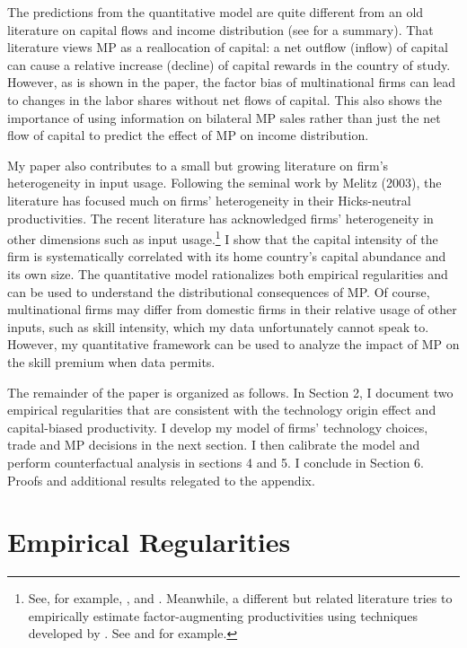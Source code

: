 \documentclass[notitlepage,11pt]{article}%
\begin{document}
The predictions from the quantitative model are quite different from an old
literature on capital flows and income distribution (see
\cite{caves_multinational_2007} for a summary). That literature views MP as a
reallocation of capital: a net outflow (inflow) of capital can cause a
relative increase (decline) of capital rewards in the country of study.
However, as is shown in the paper, the factor bias of multinational firms can
lead to changes in the labor shares without net flows of capital. This also
shows the importance of using information on bilateral MP sales rather than
just the net flow of capital to predict the effect of MP on income distribution.

My paper also contributes to a small but growing literature on firm's
heterogeneity in input usage. Following the seminal work by Melitz (2003), the
literature has focused much on firms' heterogeneity in their Hicks-neutral
productivities. The recent literature has acknowledged firms' heterogeneity in
other dimensions such as input usage.\footnote{See, for example,
\cite{crozet_firm-level_2013}, \cite{joaquin_blaum_non-homothetic_2015} and
\cite{burstein_international_2015}. Meanwhile, a different but related
literature tries to empirically estimate factor-augmenting productivities
using techniques developed by \cite{olley_dynamics_1996}. See
\cite{ulrich_doraszelski_measuring_2015} and
\cite{hongsong_zhang_non-neutral_2015} for example.} I show that the capital
intensity of the firm is systematically correlated with its home country's
capital abundance and its own size. The quantitative model rationalizes both
empirical regularities and can be used to understand the distributional
consequences of MP. Of course, multinational firms may differ from domestic
firms in their relative usage of other inputs, such as skill intensity, which
my data unfortunately cannot speak to. However, my quantitative framework can
be used to analyze the impact of MP on the skill premium when data permits.

The remainder of the paper is organized as follows. In Section 2, I document
two empirical regularities that are consistent with the technology origin
effect and capital-biased productivity. I develop my model of firms'
technology choices, trade and MP decisions in the next section. I then
calibrate the model and perform counterfactual analysis in sections 4 and 5. I
conclude in Section 6. Proofs and additional results relegated to the appendix.

\section{Empirical Regularities\label{sec:empirical_regularities}}
\end{document}
